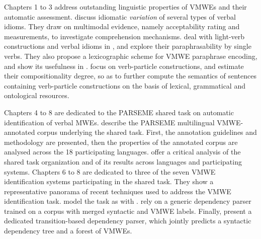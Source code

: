 \documentclass[output=paper,
modfonts,
]{langscibook}
\begin{document}
Chapters 1 %
to 3 %
address outstanding linguistic properties of VMWEs and their automatic assessment.   discuss idiomatic \emph{variation} of several types of  verbal idioms. They %
draw on multimodal evidence, namely acceptability rating and  measurements, to investigate comprehension mechanisms.  deal with light-verb constructions and verbal idioms in , and explore their paraphrasability by single verbs. They also propose a lexicographic scheme for VMWE paraphrase encoding, and show its usefulness in .   focus on  verb-particle constructions, and estimate their compositionality degree, so as to further compute the semantics of sentences containing verb-particle constructions %
on the basis of lexical, grammatical and ontological resources.

Chapters 4 %
to 8 %
are dedicated to the PARSEME shared task on automatic identification of verbal MWEs.  describe %
the PARSEME multilingual VMWE-annotated corpus underlying the shared task. First, the annotation guidelines and methodology are presented, then 
the properties of the annotated corpus are analysed across the 18 participating languages.  offer a critical analysis of the shared task organization and of its results across languages and participating systems. Chapters 6 to 8 %
are dedicated to three of the seven %
VMWE identification systems participating in the shared task. They show a representative panorama of recent techniques used to address the VMWE identification task.   model the task as  with .   rely on a generic dependency parser trained on a corpus with merged syntactic and VMWE labels. Finally,  present a dedicated transition-based dependency parser, which jointly predicts a syntactic dependency tree and a forest of VMWEs. 
\end{document}
